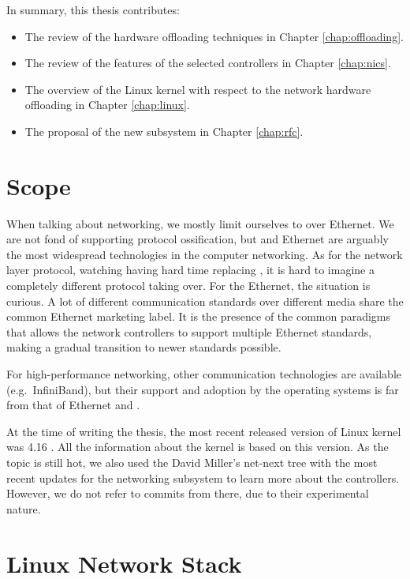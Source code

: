 In summary, this thesis contributes:
\begin{itemize}
	\item The review of the hardware offloading techniques in Chapter \ref{chap:offloading}.
	\item The review of the features of the selected controllers in Chapter \ref{chap:nics}.
	\item The overview of the Linux kernel with respect to the network hardware offloading in Chapter \ref{chap:linux}.
	\item The proposal of the new subsystem in Chapter \ref{chap:rfc}.
\end{itemize}

\section{Scope}

When talking about networking, we mostly limit ourselves to  over Ethernet.
We are not fond of supporting protocol ossification, but  and Ethernet are
arguably the most widespread technologies in the computer networking. As for the
network layer protocol, watching  having hard time replacing
, it is hard to imagine a completely different protocol taking over. For
the Ethernet, the situation is curious. A lot of different communication
standards over different media share the common Ethernet marketing label. It
is the presence of the common paradigms that allows the network controllers to support
multiple Ethernet standards, making a gradual transition to newer
standards possible.

For high-performance networking, other communication
technologies are available (e.g.\ InfiniBand), but their support and adoption by
the operating systems is far from that of Ethernet and .

At the time of writing the thesis, the most recent released version of Linux
kernel was 4.16 \cite{linux-kernel}. All the information about the kernel is
based on this version. As the topic is still hot, we also used the David
Miller's net-next tree \cite{net-next} with the most recent updates for the networking subsystem to
learn more about the controllers. However, we do not refer to commits from
there, due to their experimental nature.

\section{Linux Network Stack}

